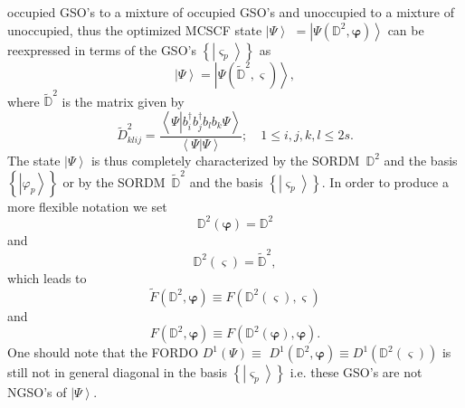 \documentclass[aps,preprint]{revtex4}%
\begin{document}
occupied GSO's to a mixture of occupied GSO's and unoccupied to a mixture of
unoccupied, thus the optimized MCSCF state $\left\vert \Psi\right\rangle $
$=\left\vert \Psi\left(  \mathbb{D}^{2},\mathbf{\varphi}\right)  \right\rangle
$ can be reexpressed in terms of the GSO's $\left\{  \left\vert \varsigma
_{p}\right\rangle \right\}  $ as
\begin{equation}
\left\vert \Psi\right\rangle =\left\vert \Psi\left(  \mathbb{\tilde{D}}%
^{2},\mathbf{\varsigma}\right)  \right\rangle ,
\end{equation}
where $\mathbb{\tilde{D}}^{2}$ is the matrix given by
\begin{equation}
\tilde{D}_{klij}^{2}=\frac{\left\langle \Psi\left\vert b_{i}^{\dagger}%
b_{j}^{\dagger}b_{l}b_{k}\Psi\right.  \right\rangle }{\left\langle \left.
\Psi\right\vert \Psi\right\rangle };\quad1\leq i,j,k,l\leq2s.
\end{equation}
The state $\left\vert \Psi\right\rangle $ is thus completely characterized by
the SORDM\ $\mathbb{D}^{2}$ and the basis $\left\{  \left\vert \varphi
_{p}\right\rangle \right\}  $ or by the SORDM\ $\mathbb{\tilde{D}}^{2}$ and
the basis $\left\{  \left\vert \varsigma_{p}\right\rangle \right\}  $. In
order to produce a more flexible notation we set
\begin{equation}
\mathbb{D}^{2}\left(  \mathbf{\varphi}\right)  =\mathbb{D}^{2}%
\end{equation}
and
\begin{equation}
\mathbb{D}^{2}\left(  \mathbf{\varsigma}\right)  =\mathbb{\tilde{D}}^{2},
\end{equation}
which leads to
\begin{equation}
\tilde{F}\left(  \mathbb{D}^{2},\mathbf{\varphi}\right)  \equiv F\left(
\mathbb{D}^{2}\left(  \mathbf{\varsigma}\right)  ,\mathbf{\varsigma}\right)
\end{equation}
and
\begin{equation}
F\left(  \mathbb{D}^{2},\mathbf{\varphi}\right)  \equiv F\left(
\mathbb{D}^{2}\left(  \mathbf{\varphi}\right)  ,\mathbf{\varphi}\right)  .
\end{equation}
One should note that the FORDO $D^{1}\left(  \Psi\right)  \equiv$
$D^{1}\left(  \mathbb{D}^{2},\mathbf{\varphi}\right)  \equiv D^{1}\left(
\mathbb{D}^{2}\left(  \mathbf{\varsigma}\right)  \right)  $ is still not in
general diagonal in the basis $\left\{  \left\vert \varsigma_{p}\right\rangle
\right\}  $ i.e. these GSO's are not NGSO's of $\left\vert \Psi\right\rangle $.
\end{document}
